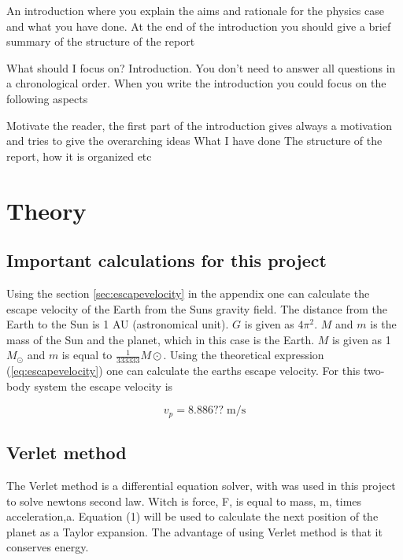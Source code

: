 \documentclass{article}
\begin{document}
An introduction where you explain the aims and rationale for the physics case and what you have done. At the end of the introduction you should give a brief summary of the structure of the report


What should I focus on? Introduction.
You don't need to answer all questions in a chronological order. When you write the introduction you could focus on the following aspects

Motivate the reader, the first part of the introduction gives always a motivation and tries to give the overarching ideas
What I have done
The structure of the report, how it is organized etc

\vspace{1cm}

\section{Theory} \label{sec:Theory}


\subsection{Important calculations for this project}

    Using the section \ref{sec:escapevelocity} in the appendix one can calculate the escape velocity of the Earth from the Suns gravity field. The distance from the Earth to the Sun is 1 AU (astronomical unit). $G$ is given as $4 \pi^{2}$. $M$ and $m$ is the mass of the Sun and the planet, which in this case is the Earth. $M$ is given as 1 $M_{\odot}$ and $m$ is equal to $\frac{1}{333333} M\odot$. Using the theoretical expression (\ref{eq:escapevelocity}) one can calculate the earths escape velocity. For this two-body system the escape velocity is

    \begin{equation}    \label{eq:theoretical escapevelocity}
        v_p = 8.886 ?? \; \textrm{m/s}
    \end{equation}



\subsection{Verlet method}

    The Verlet method is a differential equation solver, with was used in this project to solve newtons second law. Witch is force, F, is equal to mass, m, times acceleration,a. Equation (1) will be used to calculate the next position of the planet as a Taylor expansion. The advantage of using Verlet method is that it conserves energy. \\
\end{document}
